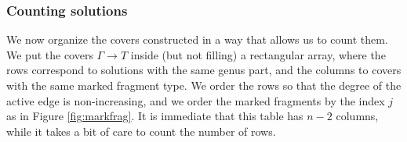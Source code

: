 \documentclass[11pt,reqno]{amsart}
\theoremstyle{definition}
\newcommand{\rcolor}[1]{{\color{blue} #1}}
\begin{document}
\subsubsection{Counting solutions} \label{sec:combinatorics}
We now organize the covers constructed in a way that allows us to count them.
We put the covers  $\Gamma \rightarrow T$ inside (but not filling) a rectangular array, where the rows correspond to solutions with the same genus part, and the columns to covers with the same marked fragment type. We order the rows so that the degree of the active edge is non-increasing, and we order the marked fragments by the index $j$ as in Figure \ref{fig:markfrag}. %
It is immediate that this table has $n-2$ columns, while it takes a bit of care to count the number of rows.
\end{document}
